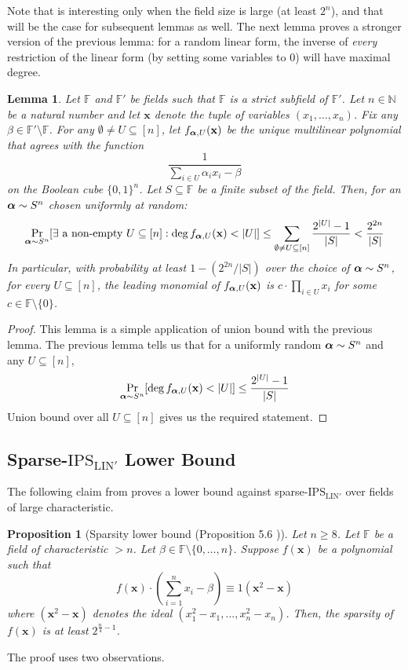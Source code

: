 \documentclass[11pt]{article}
\newtheorem{lemma}[theorem]{Lemma}
\newtheorem{proposition}[theorem]{Proposition}
\newcommand{\Boo}{\{0,1 \}}
\newcommand{\F}{\mathbb{F}}
\newcommand{\IPSLINp}{\mathrm{IPS}_{\mathrm{LIN}'}}
\begin{document}
Note that  is interesting only when the field size is large (at least $2^n$), and that will be the case for subsequent lemmas as well. The next lemma proves a stronger version of the previous lemma: for a random linear form, the inverse of \emph{every} restriction of the linear form (by setting some variables to 0) will have maximal degree.
\begin{lemma}\label{lem: deg lower bound union bound}
    Let $\F$ and $\F'$ be fields such that $\F$ is a strict subfield of $\F'$. Let $n\in \mathbb{N}$ be a natural number and let $\mathbf{x}$ denote the tuple of variables $(x_1, \dots, x_n)$. Fix any $\beta \in \F'\setminus \F$. For any $\emptyset \neq U \subseteq [n]$, let $f_{\boldsymbol{\alpha},U}(\mathbf{x})$ be the unique multilinear polynomial that agrees with the function $$\frac{1}{\sum_{i\in U}{\alpha_ix_i}-\beta}$$ on the Boolean cube $\Boo^n$.
    Let $S \subseteq \F$ be a finite subset of the field.
    Then, for an $\boldsymbol{\alpha} \sim S^n$ chosen uniformly at random: $$\Pr_{\boldsymbol{\alpha} \sim S^n}[\exists \text{ a non-empty } U\subseteq [n]:\deg{f_{\ensuremath{\boldsymbol{\alpha}},U}(\mathbf{x})} < |U|] \leq \sum_{\emptyset \neq U\subseteq [n]}\frac{2^{|U|}-1}{|S|} < \frac{2^{2n}}{|S|}$$
    In particular, with probability at least $1-(2^{2n}/|S|)$ over the choice of $\boldsymbol{\alpha} \sim S^n$, for every $U \subseteq [n]$, the leading monomial of $f_{\boldsymbol{\alpha},U}(\mathbf{x})$ is $c\cdot\prod_{i\in U}x_i$ for some $c\in\F\setminus\{0\}$. 
\end{lemma}
\begin{proof}
    This lemma is a simple application of union bound with the previous lemma. The previous lemma tells us that for a uniformly random $\boldsymbol{\alpha} \sim S^n$ and any $U\subseteq [n]$, $$\Pr_{\boldsymbol{\alpha} \sim S^n}[\deg{f_{\ensuremath{\boldsymbol{\alpha}},U}(\mathbf{x})} < |U|] \leq \frac{2^{|U|} - 1}{|S|}$$
    Union bound over all $U\subseteq [n]$ gives us the required statement.
\end{proof}

\subsection{Sparse-$\IPSLINp$ Lower Bound}
The following claim from \cite{FSTW21} proves a lower bound against sparse-$\IPSLINp$ over fields of large characteristic. 
\begin{proposition}[Sparsity lower bound (Proposition 5.6 \cite{FSTW21})]
    Let $n \geq 8$. Let $\F$ be a field of characteristic $> n$. Let $\beta \in \F\setminus\{0,\dots, n\}$. Suppose $f(\mathbf{x})$ be a polynomial such that $$f(\mathbf{x}) \cdot \left (\sum_{i=1}^{n}{x_i} - \beta \right) \equiv 1 \left({\mathbf{x}^2 - \mathbf{x}} \right )$$ where $\left({\mathbf{x}^2 - \mathbf{x}} \right)$ denotes the ideal $(x_1^2-x_1, \dots, x_n^2 - x_n)$.
    Then, the sparsity of $f(\mathbf{x})$ is at least $2^{\frac{n}{4} -  1}$.
\end{proposition}
The proof uses two observations.
\end{document}
